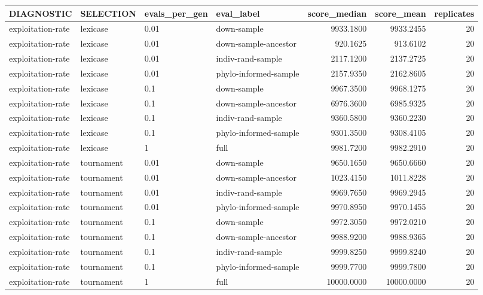 \documentclass[
]{book}
\begin{document}
\begin{tabular}{l|l|l|l|r|r|r}
\hline
DIAGNOSTIC & SELECTION & evals\_per\_gen & eval\_label & score\_median & score\_mean & replicates\\
\hline
exploitation-rate & lexicase & 0.01 & down-sample & 9933.1800 & 9933.2455 & 20\\
\hline
exploitation-rate & lexicase & 0.01 & down-sample-ancestor & 920.1625 & 913.6102 & 20\\
\hline
exploitation-rate & lexicase & 0.01 & indiv-rand-sample & 2117.1200 & 2137.2725 & 20\\
\hline
exploitation-rate & lexicase & 0.01 & phylo-informed-sample & 2157.9350 & 2162.8605 & 20\\
\hline
exploitation-rate & lexicase & 0.1 & down-sample & 9967.3500 & 9968.1275 & 20\\
\hline
exploitation-rate & lexicase & 0.1 & down-sample-ancestor & 6976.3600 & 6985.9325 & 20\\
\hline
exploitation-rate & lexicase & 0.1 & indiv-rand-sample & 9360.5800 & 9360.2230 & 20\\
\hline
exploitation-rate & lexicase & 0.1 & phylo-informed-sample & 9301.3500 & 9308.4105 & 20\\
\hline
exploitation-rate & lexicase & 1 & full & 9981.7200 & 9982.2910 & 20\\
\hline
exploitation-rate & tournament & 0.01 & down-sample & 9650.1650 & 9650.6660 & 20\\
\hline
exploitation-rate & tournament & 0.01 & down-sample-ancestor & 1023.4150 & 1011.8228 & 20\\
\hline
exploitation-rate & tournament & 0.01 & indiv-rand-sample & 9969.7650 & 9969.2945 & 20\\
\hline
exploitation-rate & tournament & 0.01 & phylo-informed-sample & 9970.8950 & 9970.1455 & 20\\
\hline
exploitation-rate & tournament & 0.1 & down-sample & 9972.3050 & 9972.0210 & 20\\
\hline
exploitation-rate & tournament & 0.1 & down-sample-ancestor & 9988.9200 & 9988.9365 & 20\\
\hline
exploitation-rate & tournament & 0.1 & indiv-rand-sample & 9999.8250 & 9999.8240 & 20\\
\hline
exploitation-rate & tournament & 0.1 & phylo-informed-sample & 9999.7700 & 9999.7800 & 20\\
\hline
exploitation-rate & tournament & 1 & full & 10000.0000 & 10000.0000 & 20\\
\hline
\end{tabular}
\end{document}
